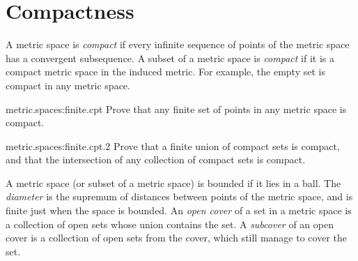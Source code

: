 \section{Compactness}
A metric space is \emph{compact} if every infinite sequence of points of the metric space has a convergent subsequence.
A subset of a metric space is \emph{compact} if it is a compact metric space in the induced metric.
For example, the empty set is compact in any metric space.
\begin{problem}{metric.spaces:finite.cpt}
Prove that any finite set of points in any metric space is compact.
\end{problem}
\begin{problem}{metric.spaces:finite.cpt.2}
Prove that a finite union of compact sets is compact, and that the intersection of any collection of compact sets is compact.
\end{problem}
A metric space (or subset of a metric space) is bounded if it lies in a ball.
The \emph{diameter} is the supremum of distances between points of the metric space, and is finite just when the space is bounded.
An \emph{open cover} of a set in a metric space is a collection of open sets whose union contains the set.
A \emph{subcover} of an open cover is a collection of open sets from the cover, which still manage to cover the set.

